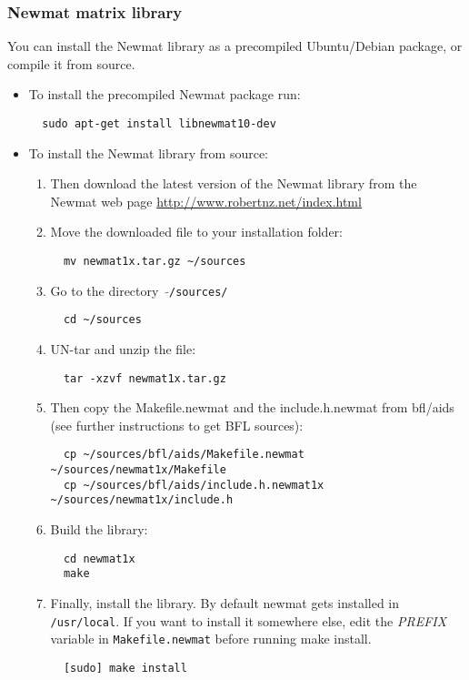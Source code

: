 \documentclass[a4paper,10pt]{article}
\begin{document}
\subsubsection{Newmat matrix library}
You can install the Newmat library as a precompiled Ubuntu/Debian
package, or compile it from source.
\begin{itemize}
\item To install the precompiled Newmat package run:
\begin{verbatim}
  sudo apt-get install libnewmat10-dev
\end{verbatim}


\item To install the Newmat library from source:
\begin{enumerate}
\item Then download the latest version of the Newmat library from the
  Newmat web page
  \url{http://www.robertnz.net/index.html}
\item Move the downloaded file to your installation folder:
\begin{verbatim}
  mv newmat1x.tar.gz ~/sources
\end{verbatim}
\item Go to the directory \ $\mathtt{\tilde{ }}$\texttt{/sources/}
\begin{verbatim}
  cd ~/sources
\end{verbatim}
\item UN-tar and unzip the file:
\begin{verbatim}
  tar -xzvf newmat1x.tar.gz
\end{verbatim}
\item Then copy the Makefile.newmat and the include.h.newmat from
  bfl/aids (see further instructions to get BFL sources):
\begin{verbatim}
  cp ~/sources/bfl/aids/Makefile.newmat ~/sources/newmat1x/Makefile
  cp ~/sources/bfl/aids/include.h.newmat1x ~/sources/newmat1x/include.h
\end{verbatim}
\item Build the library:
\begin{verbatim}
  cd newmat1x
  make 
\end{verbatim}
\item Finally, install the library.  By default newmat gets installed
  in \texttt{/usr/local}.  If you want to install it somewhere else,
  edit the \emph{PREFIX} variable in \texttt{Makefile.newmat} before
  running make install.
\begin{verbatim}
  [sudo] make install
\end{verbatim}
\end{enumerate}
\end{itemize}
\end{document}
